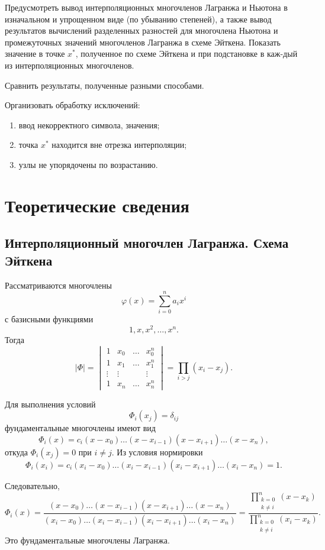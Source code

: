 \documentclass[12pt,a4paper]{article}
\begin{document}
Предусмотреть вывод интерполяционных многочленов Лагранжа и Ньютона в изначальном и упрощенном виде (по убыванию степеней), а также вывод результатов вычислений разделенных разностей для многочлена Ньютона и промежуточных значений многочленов Лагранжа в схеме Эйткена. Показать значение в точке $x^*$, полученное по схеме Эйткена и при подстановке в каж-дый из интерполяционных многочленов.

Сравнить результаты, полученные разными способами.

Организовать обработку исключений:
\begin{enumerate}
    \item ввод некорректного символа, значения;
    \item точка $x^*$ находится вне отрезка интерполяции;
    \item узлы не упорядочены по возрастанию.
\end{enumerate}

\section{Теоретические сведения}

\subsection{Интерполяционный многочлен Лагранжа. Схема Эйткена}

Рассматриваются многочлены
\[
\varphi(x)=\sum_{i=0}^{n}a_ix^i
\]
с базисными функциями
\[
1,x,x^2,\ldots,x^n.
\]
Тогда
\[
|\Phi|=
\begin{vmatrix}
1 & x_0 & \ldots & x_0^n\\
1 & x_1 & \ldots & x_1^n\\
\vdots & \vdots & & \vdots\\
1 & x_n & \ldots & x_n^n
\end{vmatrix}
=\prod_{i>j}(x_i-x_j).
\]

Для выполнения условий
\[
\Phi_i(x_j)=\delta_{ij}
\]
фундаментальные многочлены имеют вид
\[
\Phi_i(x)=c_i(x-x_0)\ldots(x-x_{i-1})(x-x_{i+1})\ldots(x-x_n),
\]
откуда $\Phi_i(x_j)=0$ при $i\ne j$. Из условия нормировки
\[
\Phi_i(x_i)=c_i(x_i-x_0)\ldots(x_i-x_{i-1})(x_i-x_{i+1})\ldots(x_i-x_n)=1.
\]

Следовательно,
\begin{equation}
\Phi_i(x)=
\frac{(x-x_0)\ldots(x-x_{i-1})(x-x_{i+1})\ldots(x-x_n)}
{(x_i-x_0)\ldots(x_i-x_{i-1})(x_i-x_{i+1})\ldots(x_i-x_n)}
=
\frac{\prod\limits_{\substack{k=0\\k\ne i}}^{n}(x-x_k)}
{\prod\limits_{\substack{k=0\\k\ne i}}^{n}(x_i-x_k)}.
\end{equation}
Это фундаментальные многочлены Лагранжа.
\end{document}

